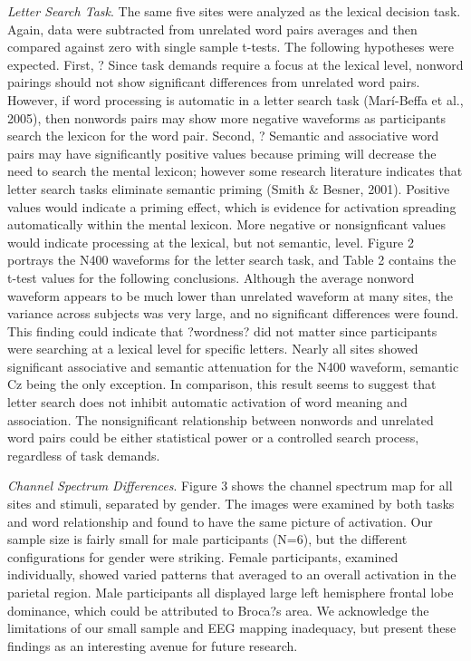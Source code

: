 \documentclass[english,man]{apa6}
\theoremstyle{definition}
\theoremstyle{definition}
\theoremstyle{remark}
\begin{document}
\emph{Letter Search Task}. The same five sites were analyzed as the
lexical decision task. Again, data were subtracted from unrelated word
pairs averages and then compared against zero with single sample
t-tests. The following hypotheses were expected. First, ? Since task
demands require a focus at the lexical level, nonword pairings should
not show significant differences from unrelated word pairs. However, if
word processing is automatic in a letter search task (Marí-Beffa et al.,
2005), then nonwords pairs may show more negative waveforms as
participants search the lexicon for the word pair. Second, ? Semantic
and associative word pairs may have significantly positive values
because priming will decrease the need to search the mental lexicon;
however some research literature indicates that letter search tasks
eliminate semantic priming (Smith \& Besner, 2001). Positive values
would indicate a priming effect, which is evidence for activation
spreading automatically within the mental lexicon. More negative or
nonsignficant values would indicate processing at the lexical, but not
semantic, level. Figure 2 portrays the N400 waveforms for the letter
search task, and Table 2 contains the t-test values for the following
conclusions. Although the average nonword waveform appears to be much
lower than unrelated waveform at many sites, the variance across
subjects was very large, and no significant differences were found. This
finding could indicate that ?wordness? did not matter since participants
were searching at a lexical level for specific letters. Nearly all sites
showed significant associative and semantic attenuation for the N400
waveform, semantic Cz being the only exception. In comparison, this
result seems to suggest that letter search does not inhibit automatic
activation of word meaning and association. The nonsignificant
relationship between nonwords and unrelated word pairs could be either
statistical power or a controlled search process, regardless of task
demands.

\emph{Channel Spectrum Differences}. Figure 3 shows the channel spectrum
map for all sites and stimuli, separated by gender. The images were
examined by both tasks and word relationship and found to have the same
picture of activation. Our sample size is fairly small for male
participants (N=6), but the different configurations for gender were
striking. Female participants, examined individually, showed varied
patterns that averaged to an overall activation in the parietal region.
Male participants all displayed large left hemisphere frontal lobe
dominance, which could be attributed to Broca?s area. We acknowledge the
limitations of our small sample and EEG mapping inadequacy, but present
these findings as an interesting avenue for future research.
\end{document}
